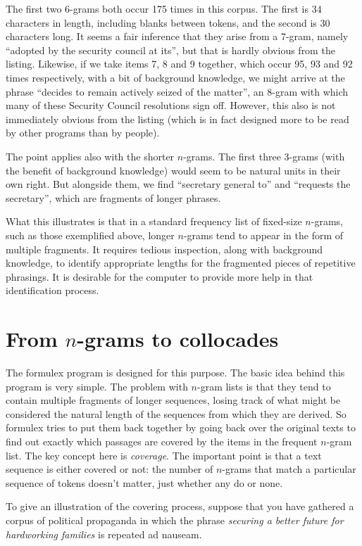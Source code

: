 \documentclass[output=paper]{langscibook}
\begin{document}
The first two 6-grams both occur 175 times in this corpus. The first is 34 characters in length, including blanks between tokens, and the second is 30 characters long. It seems a fair inference that they arise from a 7-gram, namely ``adopted by the security council at its'', but that is hardly obvious from the listing. Likewise, if we take items 7, 8 and 9 together, which occur 95, 93 and 92 times respectively, with a bit of background knowledge, we might arrive at the phrase ``decides to remain actively seized of the matter'', an 8-gram with which many of these Security Council resolutions sign off. However, this also is not immediately obvious from the listing (which is in fact designed more to be read by other programs than by people).

The point applies also with the shorter $n$-grams. The first three 3-grams (with the benefit of background knowledge) would seem to be natural units in their own right. But alongside them, we find ``secretary general to'' and ``requests the secretary'', which are fragments of longer phrases.

What this illustrates is that in a standard frequency list of fixed-size $n$-grams, such as those exemplified above, longer $n$-grams tend to appear in the form of multiple fragments. It requires tedious inspection, along with background knowledge, to identify appropriate lengths for the fragmented pieces of repetitive phrasings. It is desirable for the computer to provide more help in that identification process.

\section{From $n$-grams to collocades}\label{sec:forsyth:4}

The formulex program is designed for this purpose. The basic idea behind this program is very simple. The problem with $n$-gram lists is that they tend to contain multiple fragments of longer sequences, losing track of what might be considered the natural length of the sequences from which they are derived. So formulex tries to put them back together by going back over the original texts to find out exactly which passages are covered by the items in the frequent $n$-gram list. The key concept here is \textit{coverage}. The important point is that a text sequence is either covered or not: the number of $n$-grams that match a particular sequence of tokens doesn't matter, just whether any do or none.

To give an illustration of the covering process, suppose that you have gathered a corpus of political propaganda in which the phrase \textit{securing a better future for hardworking families} is repeated ad nauseam.
\end{document}
